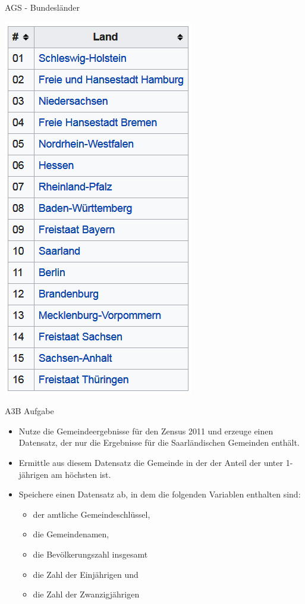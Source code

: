 \documentclass[ignorenonframetext,]{beamer}
\providecommand{\tightlist}{%
  \setlength{\itemsep}{0pt}\setlength{\parskip}{0pt}}
\begin{document}
\begin{frame}{AGS - Bundesländer}
\protect\hypertarget{ags---bundeslander}{}

\includegraphics{figure/AGS_BLA.PNG}

\end{frame}

\begin{frame}{A3B Aufgabe}
\protect\hypertarget{a3b-aufgabe}{}

\begin{itemize}
\tightlist
\item
  Nutze die Gemeindeergebnisse für den Zensus 2011 und erzeuge einen
  Datensatz, der nur die Ergebnisse für die Saarländischen Gemeinden
  enthält.
\item
  Ermittle aus diesem Datensatz die Gemeinde in der der Anteil der unter
  1-jährigen am höchsten ist.
\item
  Speichere einen Datensatz ab, in dem die folgenden Variablen enthalten
  sind:

  \begin{itemize}
  \tightlist
  \item
    der amtliche Gemeindeschlüssel,
  \item
    die Gemeindenamen,\\
  \item
    die Bevölkerungszahl insgesamt
  \item
    die Zahl der Einjährigen und
  \item
    die Zahl der Zwanzigjährigen
  \end{itemize}
\end{itemize}

\end{frame}
\end{document}
